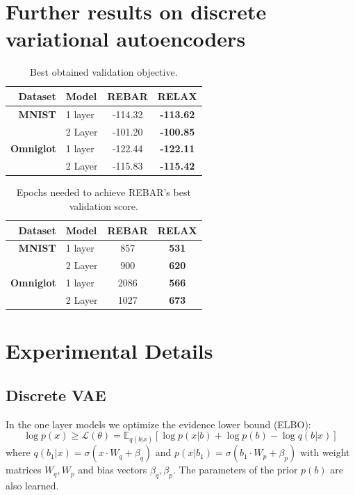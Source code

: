 \documentclass{article}
\newcommand{\E}{\mathbb{E}}
\begin{document}
\section{Further results on discrete variational autoencoders}
\label{extra vae results}

\begin{table}[h]
\centering
\begin{tabular}{r l | c c} 
  Dataset & Model & REBAR & RELAX \\\midrule
\textbf{MNIST} & 1 layer  & -114.32 & \textbf{-113.62} \\ 
& 2 Layer  & -101.20 & \textbf{-100.85} \\ \midrule
\textbf{Omniglot} & 1 layer & -122.44 & \textbf{-122.11} \\ 
& 2 Layer & -115.83 & \textbf{-115.42}
\end{tabular}
\caption{Best obtained validation objective.}
\label{tab:vae val}
\end{table}


\begin{table}[h]
\centering
\begin{tabular}{r l | c c} 
 Dataset & Model  & REBAR & RELAX \\\midrule
\textbf{MNIST} & 1 layer  & 857 & \textbf{531} \\ 
& 2 Layer  & 900 & \textbf{620} \\
\midrule
\textbf{Omniglot} & 1 layer & 2086 & \textbf{566} \\ 
& 2 Layer & 1027 & \textbf{673}
\end{tabular}
\caption{Epochs needed to achieve REBAR's best validation score.}
\label{tab:vae epochs}
\end{table}


\section{Experimental Details}
\label{experiment appendix}

\subsection{Discrete VAE}
\label{app_disc_vae}
In the one layer models we optimize the evidence lower bound (ELBO): $$\log p(x) \geq \mathcal{L}(\theta) = \E_{q(b|x)}[\log p(x|b) + \log p(b) - \log q(b|x)]$$ where $q(b_1|x) = \sigma(x\cdot W_q + \beta_q)$ and $p(x| b_1) = \sigma(b_1\cdot W_p + \beta_p)$ with weight matrices $W_q,W_p$ and bias vectors $\beta_q,\beta_p$.
The parameters of the prior $p(b)$ are also learned.
\end{document}
